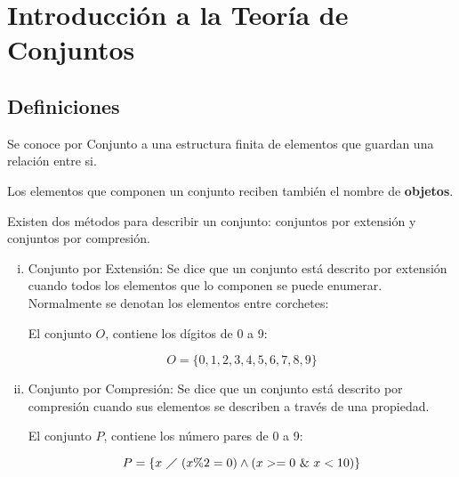 
\label{chap:cap1}

\section{Introducción a la Teoría de Conjuntos}\label{setsTheory}

\subsection{Definiciones}

 Se conoce por Conjunto 
a una estructura finita de elementos que guardan
una relación entre si.

 Los elementos que componen un conjunto reciben también el nombre de
\textbf{objetos}.

{\cor Existen dos métodos para describir un conjunto: conjuntos por extensión y 
conjuntos por compresión.}

\begin{enumerate}[i.]
\item {Conjunto por Extensión: Se dice que un conjunto está 
descrito por extensión cuando
todos los elementos que lo componen se puede enumerar. Normalmente se denotan 
los elementos
entre corchetes:

\ejem El conjunto $O$, contiene los dígitos de 0 a 9:

\begin{equation}
O = \{0,1,2,3,4,5,6,7,8,9\}
\end{equation}

}

\item {Conjunto por Compresión: Se dice que un conjunto está 
descrito por compresión
cuando sus elementos se describen a través de una propiedad.

\ejem El conjunto $P$, contiene los número pares de 0 a 9:

\begin{equation}
P = \{x\ \diagup\ (x \% 2 = 0) \wedge (x >=0\ \&\ x <10)\}
\end{equation}

}
\end{enumerate}

